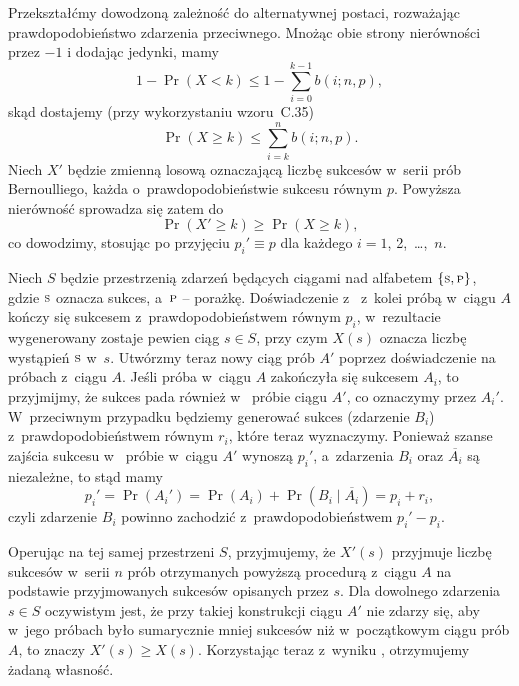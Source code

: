 \exercise{} %

\noindent Przekształćmy dowodzoną zależność do alternatywnej postaci, rozważając prawdopodobieństwo zdarzenia przeciwnego. Mnożąc obie strony nierówności przez $-1$ i dodając jedynki, mamy
\[
    1-\Pr(X<k) \le 1-\sum_{i=0}^{k-1}b(i;n,p),
\]
skąd dostajemy (przy wykorzystaniu wzoru~C.35)
\[
    \Pr(X\ge k) \le \sum_{i=k}^nb(i;n,p).
\]
Niech $X'$ będzie zmienną losową oznaczającą liczbę sukcesów w~serii prób Bernoulliego, każda o~prawdopodobieństwie sukcesu równym $p$. Powyższa nierówność sprowadza się zatem do
\[
    \Pr(X'\ge k) \ge \Pr(X\ge k),
\]
co dowodzimy, stosując  po przyjęciu $p_i'\equiv p$ dla każdego $i=1$, 2,~\dots,~$n$.

\exercise{} %
Niech $S$ będzie przestrzenią zdarzeń będących ciągami  nad alfabetem $\{{\scriptstyle\rm S},{\scriptstyle\rm P}\}$, gdzie ${\scriptstyle\rm S}$ oznacza sukces, a~${\scriptstyle\rm P}$ -- porażkę. Doświadczenie z~ z~kolei próbą w~ciągu $A$ kończy się sukcesem z~prawdopodobieństwem równym $p_i$, w~rezultacie wygenerowany zostaje pewien ciąg $s\in S$, przy czym $X(s)$ oznacza liczbę wystąpień ${\scriptstyle\rm S}$ w~$s$. Utwórzmy teraz nowy ciąg prób $A'$ poprzez doświadczenie na próbach z~ciągu $A$. Jeśli  próba w~ciągu $A$ zakończyła się sukcesem $A_i$, to przyjmijmy, że sukces pada również w~ próbie ciągu $A'$, co oznaczymy przez $A_i'$. W~przeciwnym przypadku będziemy generować sukces (zdarzenie $B_i$) z~prawdopodobieństwem równym $r_i$, które teraz wyznaczymy. Ponieważ szanse zajścia sukcesu w~ próbie w~ciągu $A'$ wynoszą $p_i'$, a~zdarzenia $B_i$ oraz $\overline{A_i}$ są niezależne, to stąd mamy
\[
    p_i' = \Pr(A_i') = \Pr(A_i)+\Pr(B_i\mid\overline{A_i}) = p_i+r_i,
\]
czyli zdarzenie $B_i$ powinno zachodzić z~prawdopodobieństwem $p_i'-p_i$.

Operując na tej samej przestrzeni $S$, przyjmujemy, że $X'(s)$ przyjmuje liczbę sukcesów w~serii $n$ prób otrzymanych powyższą procedurą z~ciągu $A$ na podstawie przyjmowanych sukcesów opisanych przez $s$. Dla dowolnego zdarzenia $s\in S$ oczywistym jest, że przy takiej konstrukcji ciągu $A'$ nie zdarzy się, aby w~jego próbach było sumarycznie mniej sukcesów niż w~początkowym ciągu prób $A$, to znaczy $X'(s)\ge X(s)$. Korzystając teraz z~wyniku , otrzymujemy żadaną własność.

